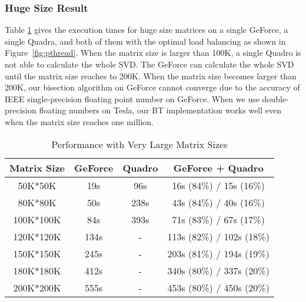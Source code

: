 \subsubsection{Huge Size Result}
Table \ref{tab:hresult} gives the execution times for huge size matrices on a single GeForce, a single Quadra, and both of them with the optimal load balancing as shown in Figure~\ref{fig:pthread}.
When the matrix size is larger than 100K, a single Quadro is not able to calculate the whole SVD.
The GeForce can calculate the whole SVD until the matrix size reaches to 200K.
When the matrix size becomes larger than 200K, our bisection algorithm on GeForce cannot converge due to the accuracy of IEEE single-precision floating point number on GeForce.
When we use double-precision floating numbers on Tesla, our BT implementation works well even when the matrix size reaches one million.

\begin{table}[h]
\caption{Performance with Very Large Matrix Sizes}
\centering
\begin{tabular}{|c|c|c|c|}
\hline
Matrix Size & GeForce & Quadro & GeForce + Quadro \\ \hline
 50K*50K    &    19s  &   96s  &    16s (84\%) /  15s (16\%) \\ \hline
 80K*80K    &    50s  &  238s  &    43s (84\%) /  40s (16\%) \\ \hline
 100K*100K  &    84s  &  393s  &    71s (83\%) /  67s (17\%) \\ \hline
 120K*120K  &   134s  &     -  &   113s (82\%) / 102s (18\%) \\ \hline
 150K*150K  &   245s  &     -  &   203s (81\%) / 194s (19\%) \\ \hline
 180K*180K  &   412s  &     -  &   340s (80\%) / 337s (20\%) \\ \hline
 200K*200K  &   555s  &     -  &   453s (80\%) / 450s (20\%)  \\ \hline
\end{tabular}
\label{tab:hresult}
\vspace{-0.22in}
\end{table}
\fi

